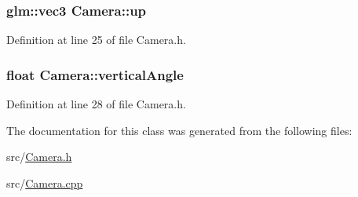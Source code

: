 \subsubsection[{up}]{\setlength{\rightskip}{0pt plus 5cm}glm\+::vec3 Camera\+::up\hspace{0.3cm}{\ttfamily [private]}}\label{class_camera_a3fe5f351380fb118ffc600591769f049}


Definition at line 25 of file Camera.\+h.

\hypertarget{class_camera_a6582a5068d81b8de7a7fc67e5143e628}{}
\subsubsection[{vertical\+Angle}]{\setlength{\rightskip}{0pt plus 5cm}float Camera\+::vertical\+Angle\hspace{0.3cm}{\ttfamily [private]}}\label{class_camera_a6582a5068d81b8de7a7fc67e5143e628}


Definition at line 28 of file Camera.\+h.



The documentation for this class was generated from the following files\+:\begin{DoxyCompactItemize}
\item 
src/\hyperlink{_camera_8h}{Camera.\+h}\item 
src/\hyperlink{_camera_8cpp}{Camera.\+cpp}\end{DoxyCompactItemize}
